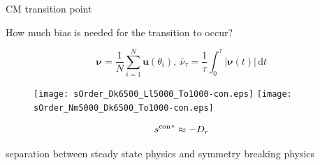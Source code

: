 \documentclass{beamer}
\begin{document}
%
%

\begin{frame}{CM transition point}


\vspace{-20pt}
\begin{center}
How much bias is needed for the transition to occur?
\end{center}
\pause

\vspace{-15pt}
\begin{equation}
\boldsymbol{\nu} = \frac{1}{N} \sum_{i=1}^N \boldsymbol{u}(\theta_i),~ \bar{\nu}_{\tau} = \frac{1}{\tau} \int_0^{\tau} |\boldsymbol{\nu}(t)| \, \text{d}t
\end{equation}
\pause

\vspace{-5pt}
\begin{figure}
\centering
\texttt{[image: sOrder\_Dk6500\_Ll5000\_To1000-con.eps]}
\texttt{[image: sOrder\_Nm5000\_Dk6500\_To1000-con.eps]}
\end{figure}

\vspace{-20pt}
\pause
\begin{equation}
{s^{\rm con}}^* \approx -D_r
\end{equation}
\begin{center}
separation between steady state physics and symmetry breaking physics
\end{center}


\end{frame}
\end{document}
